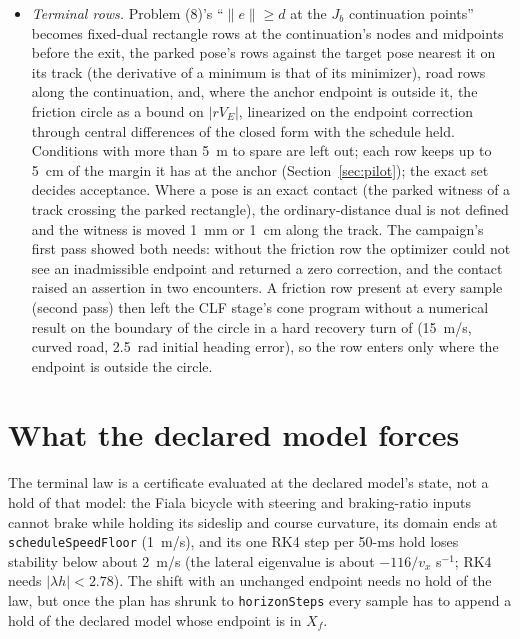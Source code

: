 \documentclass[11pt]{article}
\begin{document}
\begin{itemize}
the friction circle at the endpoint (both only relax along the
continuation).
\item \emph{Terminal rows.} Problem (8)'s ``$\lVert e\rVert\ge d$ at the
$J_b$ continuation points'' becomes fixed-dual rectangle rows at the
continuation's nodes and midpoints before the exit, the parked pose's rows
against the target pose nearest it on its track (the derivative of a
minimum is that of its minimizer), road rows along the continuation, and,
where the anchor endpoint is outside it, the friction circle as a bound on
$|rV_E|$, linearized on the endpoint
correction through central differences of the closed form with the schedule
held. Conditions with more than 5~m to spare are left out; each row keeps up
to 5~cm of the margin it has at the anchor (Section~\ref{sec:pilot}); the exact set decides
acceptance. Where a pose is an exact contact (the parked witness of a track
crossing the parked rectangle), the ordinary-distance dual is not defined and
the witness is moved 1~mm or 1~cm along the track. The campaign's first
pass showed both needs: without the friction row the optimizer could not see
an inadmissible endpoint and returned a zero correction, and the contact
raised an assertion in two encounters. A friction row present at every
sample (second pass) then left the CLF stage's cone program without a
numerical result on the boundary of the circle in a hard recovery turn of
 (15~m/s, curved road, 2.5~rad initial heading
error), so the row enters only where the endpoint is outside the circle.
\end{itemize}

\section{What the declared model forces}
\label{sec:model}
The terminal law is a certificate evaluated at the declared model's state,
not a hold of that model: the Fiala bicycle with steering and braking-ratio
inputs cannot brake while holding its sideslip and course curvature, its
domain ends at \texttt{scheduleSpeedFloor} (1~m/s), and its one RK4 step per
50-ms hold loses stability below about 2~m/s (the lateral eigenvalue is about
$-116/v_x$ s$^{-1}$; RK4 needs $|\lambda h|<2.78$). The shift with an unchanged
endpoint needs no hold of the law, but once the plan has shrunk to
\texttt{horizonSteps} every sample has to append a hold of the declared model
whose endpoint is in $X_f$.
\end{document}
